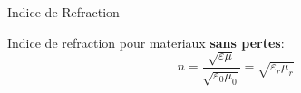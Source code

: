 \begin{frame}{Indice de Refraction}
    \begin{twocolumns}[0.5]
        \leftcol
            Indice de refraction pour materiaux \textbf{sans pertes}:
            \begin{equation}
                n =\frac{\sqrt{\varepsilon \mu}}{\sqrt{\varepsilon_0 \mu_0}} = \sqrt{\varepsilon_r \mu_r}
            \end{equation}
        \rightcol
    \end{twocolumns}
\end{frame}


\begin{comment}
\subsection[4min - Max]{Charge Movement}
\begin{frame}{Plan}
    \begin{makelist}[\small][1.5]
        \icon[red]{\faTimes} & Comment les Electrons bougent\\
        \icon[red]{\faTimes} & Propriété materiaux
    \end{makelist}
\end{frame}

\begin{frame}{EM Properties of metals}
    \maketable{conductivity}
\end{frame}


\subsection[3min - Max]{Passive Components \rom{1}}
\begin{frame}{Plan}
    \begin{makelist}[\small][1.5]
        \icon[red]{\faTimes} & Resistance\\
        \icon[red]{\faTimes} & Condensateur \\
        \icon[red]{\faTimes} & Inducteur
    \end{makelist}
\end{frame}
\end{comment}